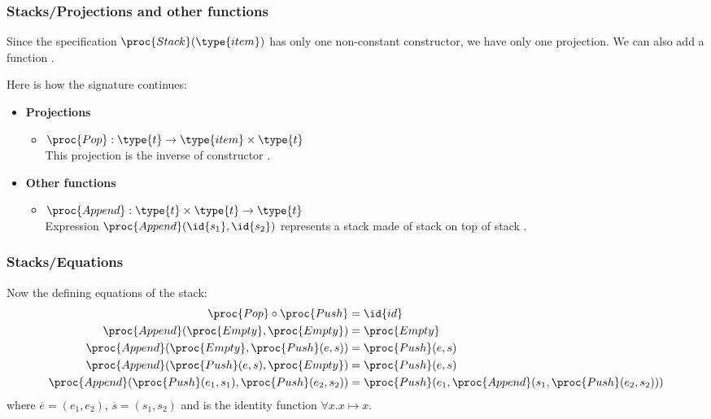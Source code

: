%
\begin{frame}
\frametitle{Stacks/Projections and other functions}

Since the specification \(\proc{Stack}(\type{item})\) has only one
non-constant constructor, we have only one projection. We can also add
a function .

\bigskip

Here is how the signature continues:
\begin{itemize}

  \item \textbf{Projections}

  \begin{itemize}

    \item \(\proc{Pop} : \type{t} \rightarrow \type{item} \times
      \type{t}\)\\ This projection is the inverse of constructor
      .

  \end{itemize}

  \item \textbf{Other functions}

  \begin{itemize}

    \item \(\proc{Append} : \type{t} \times \type{t} \rightarrow
      \type{t}\)\\ Expression \(\proc{Append} (\id{s_1}, \id{s_2})\)
      represents a stack made of stack  on top of stack
      .

  \end{itemize}

\end{itemize}

\end{frame}

%
\begin{frame}
\frametitle{Stacks/Equations}

Now the defining equations of the stack:
{\small
\begin{align*}
\proc{Pop}  \circ \proc{Push} &= \id{id}\\
\proc{Append} (\proc{Empty}, \proc{Empty}) &= \proc{Empty}\\
  \proc{Append} (\proc{Empty}, \proc{Push} (e, s)) 
   &= \proc{Push} (e, s)\\
\proc{Append} (\proc{Push} (e, s), \proc{Empty}) 
   &= \proc{Push} (e, s)\\
\proc{Append} (\proc{Push} (e_1, s_1), \proc{Push}
     (e_2, s_2))
   &= \proc{Push} (e_1, \proc{Append} (s_1, \proc{Push} (e_2, s_2)))
\end{align*}
}
where \(\overline{e} = (e_1, e_2)\),
\(\overline{s} = (s_1, s_2)\) and  is the
identity function \(\forall x.x \mapsto x\).

\end{frame}

